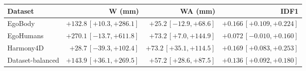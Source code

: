 \begin{tabular}{lrrr}
\toprule
Dataset & W (mm) & WA (mm) & IDF1 \\
\midrule
EgoBody & $+132.8\,[+10.3,+286.1]$ & $+25.2\,[-12.9,+68.6]$ & $+0.166\,[+0.109,+0.224]$ \\
EgoHumans & $+270.1\,[-13.7,+611.8]$ & $+73.2\,[+7.0,+144.9]$ & $+0.072\,[-0.010,+0.160]$ \\
Harmony4D & $+28.7\,[-39.3,+102.4]$ & $+73.2\,[+35.1,+114.5]$ & $+0.169\,[+0.083,+0.253]$ \\
\midrule
Dataset-balanced & $+143.9\,[+36.1,+269.5]$ & $+57.2\,[+28.6,+87.5]$ & $+0.136\,[+0.092,+0.180]$ \\
\bottomrule
\end{tabular}
